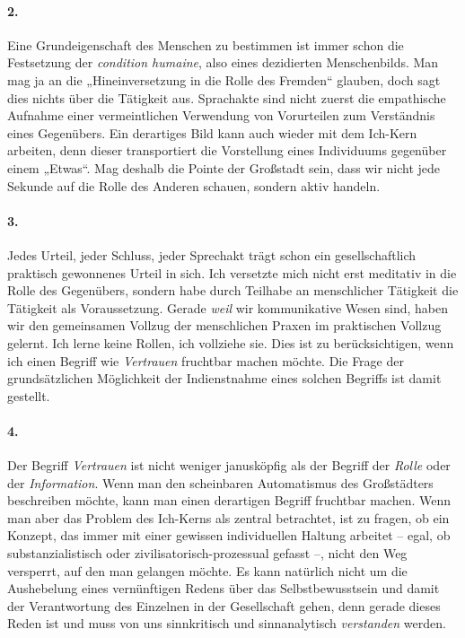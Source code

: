 \documentclass[12pt,a4paper]{article}
\begin{document}
\paragraph{2.} 
Eine Grundeigenschaft des Menschen zu bestimmen ist immer schon die Festsetzung
der \emph{condition humaine}, also eines dezidierten Menschenbilds. Man mag ja
an die „Hineinversetzung in die Rolle des Fremden“ glauben, doch sagt dies
nichts über die Tätigkeit aus. Sprachakte sind nicht zuerst die empathische
Aufnahme einer vermeintlichen Verwendung von Vorurteilen zum Verständnis eines
Gegenübers. Ein derartiges Bild kann auch wieder mit dem Ich-Kern arbeiten,
denn dieser transportiert die Vorstellung eines Individuums gegenüber einem
„Etwas“. Mag deshalb die Pointe der Großstadt sein, dass wir nicht jede Sekunde
auf die Rolle des Anderen schauen, sondern aktiv handeln.

\paragraph{3.} 
Jedes Urteil, jeder Schluss, jeder Sprechakt trägt schon ein gesellschaftlich
praktisch gewonnenes Urteil in sich. Ich versetzte mich nicht erst meditativ in
die Rolle des Gegenübers, sondern habe durch Teilhabe an menschlicher Tätigkeit
die Tätigkeit als Voraussetzung. Gerade \emph{weil} wir kommunikative Wesen
sind, haben wir den gemeinsamen Vollzug der menschlichen Praxen im praktischen
Vollzug gelernt. Ich lerne keine Rollen, ich vollziehe sie. Dies ist zu
berücksichtigen, wenn ich einen Begriff wie \emph{Vertrauen} fruchtbar machen
möchte. Die Frage der grundsätzlichen Möglichkeit der Indienstnahme eines
solchen Begriffs ist damit gestellt.

\paragraph{4.} 
Der Begriff \emph{Vertrauen} ist nicht weniger janusköpfig als der Begriff der
\emph{Rolle} oder der \emph{Information}. Wenn man den scheinbaren Automatismus
des Großstädters beschreiben möchte, kann man einen derartigen Begriff
fruchtbar machen. Wenn man aber das Problem des Ich-Kerns als zentral
betrachtet, ist zu fragen, ob ein Konzept, das immer mit einer gewissen
individuellen Haltung arbeitet – egal, ob substanzialistisch oder
zivilisatorisch-prozessual gefasst –, nicht den Weg versperrt, auf den man
gelangen möchte. Es kann natürlich nicht um die Aushebelung eines vernünftigen
Redens über das Selbstbewusstsein und damit der Verantwortung des Einzelnen in
der Gesellschaft gehen, denn gerade dieses Reden ist und muss von uns
sinnkritisch und sinnanalytisch \emph{verstanden} werden.
\end{document}
